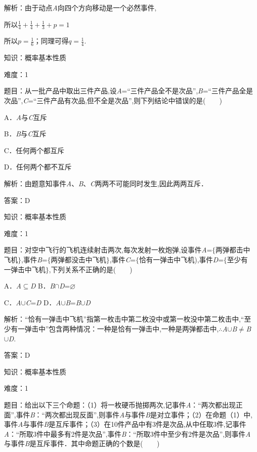 \documentclass{article} %
\begin{document}
解析：由于动点\textit{A}向四个方向移动是一个必然事件,

所以$\frac{1}{4}+\frac{1}{4}+\frac{1}{3}+p=1$

所以$p=\frac{1}{6}$；同理可得$q=\frac{1}{4}$.



知识：概率基本性质

难度：1

题目：从一批产品中取出三件产品,设\textit{A}=``三件产品全不是次品'',\textit{B}=``三件产品全是次品'',\textit{C}=``三件产品有次品,但不全是次品'',则下列结论中错误的是(　　)

A．\textit{A}与\textit{C}互斥

B．\textit{B}与\textit{C}互斥

C．任何两个都互斥

D．任何两个都不互斥

解析：由题意知事件\textit{A}、\textit{B}、\textit{C}两两不可能同时发生,因此两两互斥．

答案：D

知识：概率基本性质

难度：1

题目：对空中飞行的飞机连续射击两次,每次发射一枚炮弹,设事件\textit{A}=$\mathrm{\{}$两弹都击中飞机$\mathrm{\}}$,事件\textit{B}=$\mathrm{\{}$两弹都没击中飞机$\mathrm{\}}$,事件\textit{C}=$\mathrm{\{}$恰有一弹击中飞机),事件\textit{D}=$\mathrm{\{}$至少有一弹击中飞机$\mathrm{\}}$,下列关系不正确的是(　　)

A．\textit{A}$\mathrm{\subseteq }$\textit{D}     B．\textit{B}$\mathrm{\cap}$\textit{D}=$\varnothing$

C．\textit{A}$\mathrm{\cup}$\textit{C}=\textit{D}  D．\textit{A}$\mathrm{\cup}$\textit{B}=\textit{B}$\mathrm{\cup}$\textit{D}

解析：``恰有一弹击中飞机''指第一枚击中第二枚没中或第一枚没中第二枚击中,``至少有一弹击中''包含两种情况：一种是恰有一弹击中,一种是两弹都击中,$\mathrm{\therefore}$\textit{A}$\mathrm{\cup}$\textit{B}$\mathrm{\neq}$\textit{B}$\mathrm{\cup}$\textit{D}.

答案：D

知识：概率基本性质

难度：1

题目：给出以下三个命题：（1）将一枚硬币抛掷两次,记事件\textit{A}：``两次都出现正面'',事件\textit{B}：``两次都出现反面'',则事件\textit{A}与事件\textit{B}是对立事件；（2）在命题（1）中,事件\textit{A}与事件\textit{B}是互斥事件；（3）在10件产品中有3件是次品,从中任取3件,记事件\textit{A}：``所取3件中最多有2件是次品'',事件\textit{B}：``所取3件中至少有2件是次品'',则事件\textit{A}与事件\textit{B}是互斥事件．其中命题正确的个数是(　　)
\end{document}
